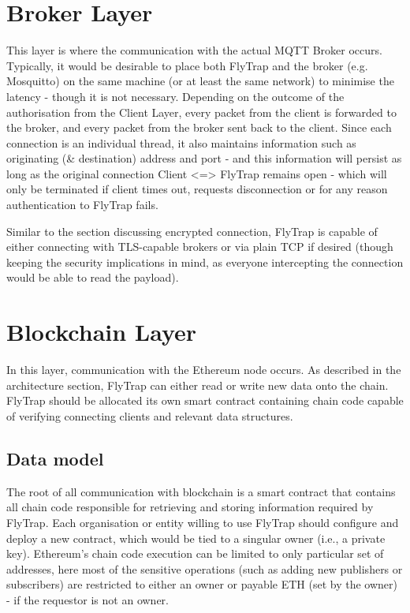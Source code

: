 \section{Broker Layer}

This layer is where the communication with the actual MQTT Broker occurs. Typically, it would be desirable to place both FlyTrap and the broker (e.g. Mosquitto) on the same machine (or at least the same network) to minimise the latency - though it is not necessary. Depending on the outcome of the authorisation from the Client Layer, every packet from the client is forwarded to the broker, and every packet from the broker sent back to the client. Since each connection is an individual thread, it also maintains information such as originating (\& destination) address and port - and this information will persist as long as the original connection Client <=> FlyTrap remains open - which will only be terminated if client times out, requests disconnection or for any reason authentication to FlyTrap fails.

Similar to the section discussing encrypted connection, FlyTrap is capable of either connecting with TLS-capable brokers or via plain TCP if desired (though keeping the security implications in mind, as everyone intercepting the connection would be able to read the payload).

\section{Blockchain Layer}
In this layer, communication with the Ethereum node occurs. As described in the architecture section, FlyTrap can either read or write new data onto the chain. FlyTrap should be allocated its own smart contract containing chain code capable of verifying connecting clients and relevant data structures. 
\subsection{Data model}
The root of all communication with blockchain is a smart contract that contains all chain code responsible for retrieving and storing information required by FlyTrap. Each organisation or entity willing to use FlyTrap should configure and deploy a new contract, which would be tied to a singular owner (i.e., a private key). Ethereum's chain code execution can be limited to only particular set of addresses, here most of the sensitive operations (such as adding new publishers or subscribers) are restricted to either an owner or payable ETH (set by the owner) - if the requestor is not an owner.

